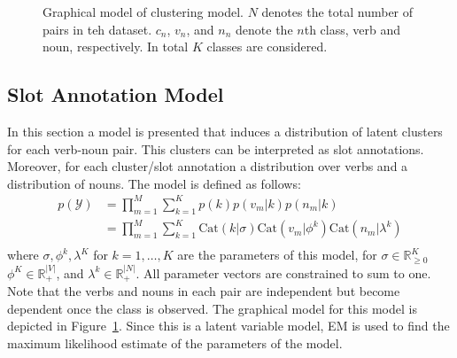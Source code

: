\documentclass[11pt]{scrartcl}
\newcommand{\Cat}{\text{Cat}}
\begin{document}
\begin{figure}
\centering
{}
\caption{Graphical model of clustering model. $N$ denotes the total
number of pairs in teh dataset. $c_n$, $v_n$, and $n_n$ denote the
$n$th class, verb and noun, respectively. In total $K$ classes are
considered.}
\label{fig:graphmodel}
\end{figure}


\subsection{Slot Annotation Model} %
\label{sec:verbclasses}
In this section a model is presented that induces a distribution of
latent clusters for each verb-noun pair. This clusters can be
interpreted as slot annotations. Moreover, for each cluster/slot
annotation a distribution over verbs and a distribution of nouns. The
model is defined as follows:
\begin{align*}
  p(\mathcal{Y})
  &= \prod_{m=1}^M \sum_{k=1}^K p(k)p(v_m|k)p(n_m|k) \\
  &= \prod_{m=1}^M \sum_{k=1}^K \Cat(k|\sigma)\Cat(v_m|\phi^k)\Cat(n_m|\lambda^k) \\
\end{align*}
where $\sigma, \phi^k, \lambda^K$ for $k=1,\ldots,K$ are the
parameters of this model, for $\sigma \in \mathbb{R}_{\ge 0}^K$ $\phi^K \in
\mathbb{R}_+^{|V|}$, and $\lambda^k \in \mathbb{R}_+^{|N|}$. All
parameter vectors are constrained to sum to one. Note that the verbs
and nouns in each pair are independent but become dependent once the
class is observed. The graphical model for this model is depicted in
Figure~\ref{fig:graphmodel}. Since this is a latent variable model, EM
is used to find the maximum likelihood estimate of the parameters of
the model.
\end{document}
